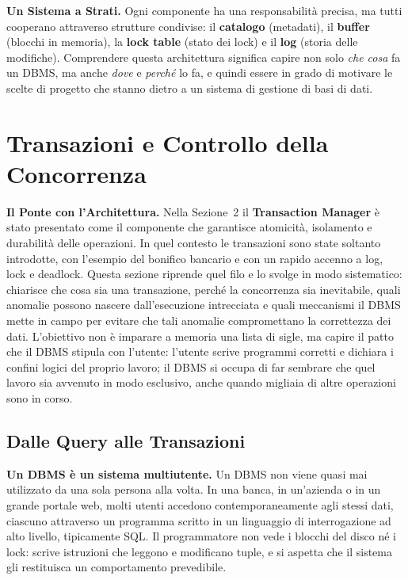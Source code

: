 \documentclass[12pt]{extarticle}
\begin{document}
\medskip
\noindent \textbf{Un Sistema a Strati.} Ogni componente ha una responsabilità precisa, ma tutti cooperano attraverso strutture condivise: il \textbf{catalogo} (metadati), il \textbf{buffer} (blocchi in memoria), la \textbf{lock table} (stato dei lock) e il \textbf{log} (storia delle modifiche). Comprendere questa architettura significa capire non solo \textit{che cosa} fa un DBMS, ma anche \textit{dove} e \textit{perché} lo fa, e quindi essere in grado di motivare le scelte di progetto che stanno dietro a un sistema di gestione di basi di dati.

\newpage

\section{Transazioni e Controllo della Concorrenza}

\noindent \textbf{Il Ponte con l'Architettura.} Nella Sezione~2 il \textbf{Transaction Manager} è stato presentato come il componente che garantisce atomicità, isolamento e durabilità delle operazioni. In quel contesto le transazioni sono state soltanto introdotte, con l'esempio del bonifico bancario e con un rapido accenno a log, lock e deadlock. Questa sezione riprende quel filo e lo svolge in modo sistematico: chiarisce che cosa sia una transazione, perché la concorrenza sia inevitabile, quali anomalie possono nascere dall'esecuzione intrecciata e quali meccanismi il DBMS mette in campo per evitare che tali anomalie compromettano la correttezza dei dati. L'obiettivo non è imparare a memoria una lista di sigle, ma capire il patto che il DBMS stipula con l'utente: l'utente scrive programmi corretti e dichiara i confini logici del proprio lavoro; il DBMS si occupa di far sembrare che quel lavoro sia avvenuto in modo esclusivo, anche quando migliaia di altre operazioni sono in corso.

\subsection{Dalle Query alle Transazioni}

\noindent \textbf{Un DBMS è un sistema multiutente.} Un DBMS non viene quasi mai utilizzato da una sola persona alla volta. In una banca, in un'azienda o in un grande portale web, molti utenti accedono contemporaneamente agli stessi dati, ciascuno attraverso un programma scritto in un linguaggio di interrogazione ad alto livello, tipicamente SQL. Il programmatore non vede i blocchi del disco né i lock: scrive istruzioni che leggono e modificano tuple, e si aspetta che il sistema gli restituisca un comportamento prevedibile.
\end{document}
